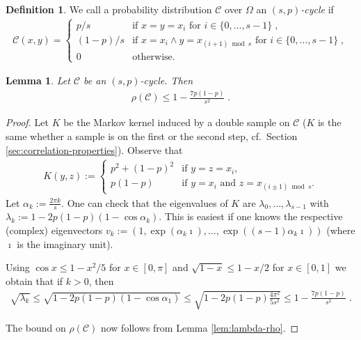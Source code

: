 \documentclass{daj}
\newcommand{\1}{\mathbbm{1}}
\theoremstyle{plain}
\newtheorem{lemma}[theorem]{Lemma}
\theoremstyle{definition}
\newtheorem{definition}[theorem]{Definition}
\begin{document}
\begin{definition}
We call a probability distribution $\mathcal{C}$ over $\Omega$
an \emph{$(s, p)$-cycle} if
\begin{align*}
\mathcal{C}(x, y) = \begin{cases}
p / s & \text{if } x=y=x_i \text{ for } i \in \{0, \ldots, s-1\} \; , \\
(1-p) / s &\text{if } x=x_i \land y=x_{(i+1) \bmod s} \text{ for } i \in \{0, \ldots, s-1\} \; ,\\
0 & \text{otherwise.}
\end{cases}
\end{align*}
\end{definition}

\begin{lemma}
\label{lem:cycle-rho}
Let $\mathcal{C}$ be an $(s, p)$-cycle. Then
\begin{align*}
  \rho(\mathcal{C}) \le 1-\frac{7p(1-p)}{s^2} \; .
\end{align*}
\end{lemma}

\begin{proof}
Let $K$ be the Markov kernel induced by a double sample on $\mathcal{C}$
($K$ is the same whether a sample is on the first or the second step,
cf.~Section \ref{sec:correlation-properties}). Observe that
\begin{align*}
K(y, z) := \begin{cases}
  p^2 + (1-p)^2 & \text{if $y=z=x_i$,}\\
  p(1-p) & \text{if $y=x_i$ and $z=x_{(i\pm 1) \bmod s}$.}
\end{cases}
\end{align*}
Let $\alpha_k := \frac{2\pi k}{s}$.
One can check that the eigenvalues
of $K$ are $\lambda_0, \ldots, \lambda_{s-1}$
with $\lambda_k := 1-2p(1-p)(1-\cos \alpha_k)$. 
This is easiest if one knows the respective (complex) eigenvectors 
$v_k := (1, \exp(\alpha_k \imath), \ldots, \exp((s-1)\alpha_k \imath))$ 
(where $\imath$ is the imaginary unit).

Using $\cos x \le 1-x^2/5$ for $x \in [0, \pi]$
and $\sqrt{1-x} \le 1-x/2$ for $x \in [0, 1]$ we obtain that if $k > 0$,
then
\begin{align*}
  \sqrt{\lambda_k} \le \sqrt{1-2p(1-p)(1-\cos \alpha_1)}
 \le 
 \sqrt{1-2p(1-p)\frac{4\pi^2}{5s^2}}
 \le 1 - \frac{7p(1-p)}{s^2} \; .
\end{align*}

The bound on $\rho(\mathcal{C})$ now follows from Lemma \ref{lem:lambda-rho}.
\end{proof}
\end{document}
